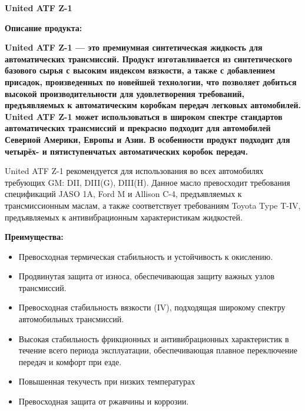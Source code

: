 \documentclass[12pt,a4paper]{article}
\begin{document}
\begin{spacing}{2.5}
{\textbf{\fontsize{20pt}{30pt}\selectfont United ATF Z-1}}
\end{spacing}

\begin{spacing}{2.5}
{\textbf{\fontsize{14pt}{4pt}\selectfont Описание продукта:}}
\end{spacing}

{\textbf{United ATF Z-1 — это премиумная синтетическая жидкость для автоматических трансмиссий. Продукт изготавливается из синтетического базового сырья с высоким индексом вязкости, а также с добавлением присадок, произведенных по новейшей технологии, что позволяет добиться  высокой производительности для удовлетворения требований, предъявляемых к автоматическим коробкам передач легковых автомобилей. United ATF Z-1 может использоваться в широком спектре стандартов автоматических трансмиссий и прекрасно подходит для автомобилей Северной Америки, Европы и Азии. В особенности продукт подходит для четырёх- и пятиступенчатых автоматических коробок передач.}}

United ATF Z-1 рекомендуется для использования во всех автомобилях требующих GM: DII, DIII(G), DIII(H). Данное масло превосходит требования спецификаций JASO 1A, Ford M и Allison C-4, предъявляемых к трансмиссионным маслам, а также соответствует требованиям Toyota Type T-IV, предъявляемых к антивибрационным характеристикам жидкостей.

\bigskip
{\textbf{\fontsize{14pt}{10pt}\selectfont Преимущества:}}

\begin{itemize}[itemsep=1.4pt]

\item  Превосходная термическая стабильность и устойчивость к окислению.
\item  Продвинутая защита от износа, обеспечивающая защиту важных узлов трансмиссий.
\item  Превосходная стабильность вязкости (IV), подходящая широкому спектру автомобильных трансмиссий.
\item  Высокая стабильность фрикционных и антивибрационных характеристик в течение всего периода эксплуатации, обеспечивающая плавное переключение передач и комфорт при езде.
\item  Повышенная текучесть при низких температурах
\item  Превосходная защита от ржавчины и коррозии.
 
\end{itemize}
\end{document}
